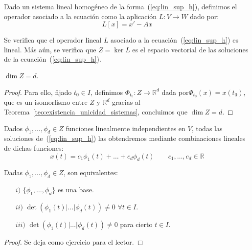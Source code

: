 \begin{definicion}
    Dado un sistema lineal homogéneo de la forma~(\ref{eq:lin_sup_h}), definimos el operador asociado a la ecuación como la aplicación $L:V\rightarrow W$ dado por:
    \begin{equation*}
        L[x] = x' - Ax
    \end{equation*}
\end{definicion}
Se verifica que el operador lineal $L$ asociado a la ecuación~(\ref{eq:lin_sup_h}) es lineal. Más aún, se verifica que $Z=\ker L$ es el espacio vectorial de las soluciones de la ecuación~(\ref{eq:lin_sup_h}). 

\begin{prop}
    $\dim Z = d$.
    \begin{proof}
        Para ello, fijado $t_0\in I$, definimos $\Phi_{t_0}:Z\rightarrow\mathbb{R}^d$ dada por\newline $\Phi_{t_0}(x) = x(t_0)$, que es un isomorfismo entre $Z$ y $\mathbb{R}^d$ gracias al Teorema~\ref{teo:existencia_unicidad_sistemas}, concluimos que $\dim Z = d$.
    \end{proof}
\end{prop}

Dados $\phi_1,\ldots,\phi_d\in Z$ funciones linealmente independientes en $V$, todas las soluciones de~(\ref{eq:lin_sup_h}) las obtendremos mediante combinaciones lineales de dichas funciones:
\begin{equation*}
    x(t) = c_1\phi_1(t) + \ldots + c_d\phi_d(t) \qquad c_1,\ldots,c_d\in \mathbb{R}
\end{equation*}

\begin{prop}
    Dadas $\phi_1,\ldots,\phi_d\in Z$, son equivalentes:
    \begin{enumerate}
        \item[$i)$] $\{\phi_1,\ldots,\phi_d\}$ es una base.
        \item[$ii)$] $\det(\phi_1(t)|\ldots|\phi_d(t)) \neq 0$ $\forall t\in I$.
        \item[$iii)$] $\det(\phi_1(t)|\ldots|\phi_d(t)) \neq 0$ para cierto $t\in I$.
    \end{enumerate}
    \begin{proof}
        Se deja como ejercicio para el lector.
    \end{proof}
\end{prop}~\\

